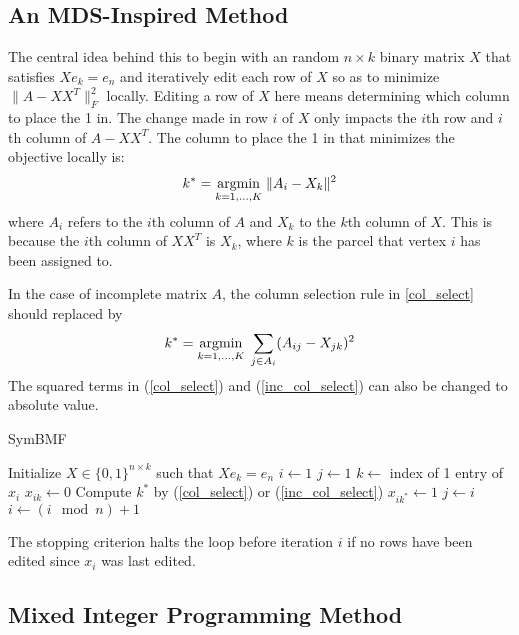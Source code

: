 \subsection{An MDS-Inspired Method}

The central idea behind this to begin with an random $n \times k$
binary matrix $X$ that satisfies $X e_k = e_n$ and iteratively
edit each row of $X$ so as to minimize $\|A - X X^T\|_F^2$ locally.
Editing a row of $X$ here means determining which column to place the 1
in. The change made in row $i$ of $X$ only impacts the $i$th row and
$i$th column of $A - X X^T$. The column to place the 1 in that minimizes
the objective locally is:
\begin{equation} \label{col_select}
k^* = \underset{k = 1,...,K}{\mathrm{arg min}}\; \|A_i - X_k\|^2
\end{equation}
where $A_i$ refers to the $i$th column of $A$ and $X_k$ to the $k$th
column of $X$. This is because the $i$th column of $X X^T$ is $X_k$,
where $k$ is the parcel that vertex $i$ has been assigned to.

In the case of incomplete matrix $A$, the column selection rule in
\ref{col_select} should replaced by
\begin{equation} \label{inc_col_select}
k^* = \underset{k = 1,...,K}{\mathrm{arg min}}\; \sum_{j \in A_i} (A_{ij} - X_{jk})^2
\end{equation}
The squared terms in (\ref{col_select}) and (\ref{inc_col_select}) can
also be changed to absolute value.

\begin{algorithm}
\caption{SymBMF}
\begin{algorithmic}[1]
\State Initialize $X \in \{0, 1\}^{n \times k}$ such that $X e_k = e_n$
\State $i \gets 1$
\State $j \gets 1$
\Repeat
  \State $k \gets$ index of 1 entry of $x_i$
  \State $x_{ik} \gets 0$
  \State Compute $k^*$ by (\ref{col_select}) or (\ref{inc_col_select})
  \State $x_{ik^*} \gets 1$
   
    \State $j \gets i$
  \EndIf
  \State $i \gets (i \mod n) + 1$
\end{algorithmic}
\end{algorithm}

The stopping criterion halts the loop before iteration $i$ if no rows
have been edited since $x_i$ was last edited.



\subsection{Mixed Integer Programming Method}

